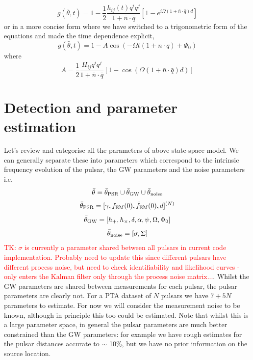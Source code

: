\documentclass[fleqn,usenatbib,useAMS]{mnras}
\begin{document}
\begin{equation} \label{eq:final}
	g(\bar{\theta},t) = 1 - \frac{1}{2} \frac{h_{ij}(t) q^i q^j}{1 + \bar{n} \cdot \bar{q}}[1 - e^{i \Omega(1+\bar{n} \cdot \bar{q}) d}]
\end{equation}
or in a more concise form where we have switched to a trigonometric form of the equations and made the time dependence explicit,
\begin{equation} 
	g(\bar{\theta},t) = 1 -A \cos(-\Omega t (1 + n\cdot q ) + \Phi_0)
\end{equation}
where 
\begin{equation}
	A =  \frac{1}{2} \frac{H_{ij} q^i q^j}{1 + \bar{n} \cdot \bar{q}}[1 - \cos\left( {\Omega(1+\bar{n} \cdot \bar{q}) d}\right)]
		\label{eq:state2}
\end{equation}


\section{Detection and parameter estimation}
Let's  review and categorise all the parameters of above state-space model. We can generally separate these into parameters which correspond to the intrinsic frequency evolution of the pulsar, the GW parameters and the noise parameters i.e.
\begin{equation}
	\bar{\theta} =  \bar{\theta}_{\rm PSR} \cup \bar{\theta}_{\rm GW} \cup \bar{\theta}_{\rm noise}
\end{equation}
\begin{equation}
	\bar{\theta}_{\rm PSR} = [\gamma, f_{\rm EM}(0), \dot{f}_{\rm EM}(0),d]^{(N)}
\end{equation}
\begin{equation}
	\bar{\theta}_{\rm GW} = [h_{+}, h_{\times}, \delta, \alpha, \psi, \Omega, \Phi_0]
\end{equation}
\begin{equation}
	\bar{\theta}_{\rm noise} = [\sigma, \Sigma]
\end{equation}
\textcolor{red}{TK: $\sigma$ is currently a parameter shared between all pulsars in current code implementation. Probably need to update this since different pulsars have different process noise, but need to check identifiability and likelihood curves - only enters the Kalman filter only through the process noise matrix...}. Whilst the GW parameters are shared between measurements for each pulsar, the pulsar parameters are clearly not. For a PTA dataset of $N$ pulsars we have $7 + 5N$ parameters to estimate. For now we will consider the measurement noise to be known, although in principle this too could be estimated. Note that whilst this is a large parameter space, in general the pulsar parameters are much better constrained than the GW parameters: for example we have rough estimates for the pulsar distances accurate to $\sim$ 10$\%$, but we have no prior information on the source location. \newline 
\end{document}
